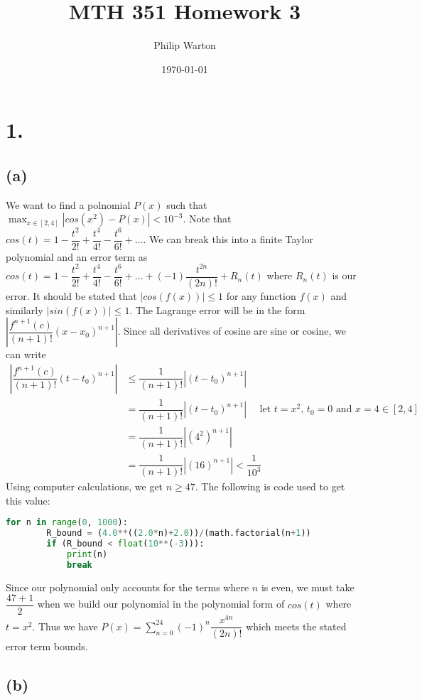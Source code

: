 \documentclass{article}
\begin{document}
\title{MTH 351 Homework 3}
\author{Philip Warton}
\date{\today}
\maketitle

\section*{1.}
	\subsection*{(a)}
		We want to find a polnomial $P(x)$ such that $\max_{x \in [2,4]} |cos(x^2) - P(x)| < 10^{-3}$.
		Note that $cos(t) = 1 - \dfrac{t^2}{2!} + \dfrac{t^4}{4!} - \dfrac{t^6}{6!} + ...$.
		We can break this into a finite Taylor polynomial and an error term as
		$cos(t) = 1 - \dfrac{t^2}{2!} + \dfrac{t^4}{4!} - \dfrac{t^6}{6!} + ... + (-1)\dfrac{t^{2n}}{(2n)!} + R_n(t)$ where $R_n(t)$ is our error.
		It should be stated that $|cos(f(x))| \leqslant 1$ for any function $f(x)$ and similarly $|sin(f(x))| \leqslant 1$.
		The Lagrange error will be in the form $\left| \dfrac{f^{n+1}(c)}{(n+1)!}(x-x_0)^{n+1}\right|$.
		Since all derivatives of cosine are sine or cosine, we can write
		\begin{align*}
			\left| \dfrac{f^{n+1}(c)}{(n+1)!}(t-t_0)^{n+1}\right| & \leqslant \dfrac{1}{(n+1)!}\left|(t-t_0)^{n+1}\right| \\
			& = \dfrac{1}{(n+1)!}\left|(t-t_0)^{n+1}\right| \ \ \ \ \ \ \text{let $t = x^2$, $t_0 = 0$ and $x = 4 \in [2,4]$} \\
			& =  \dfrac{1}{(n+1)!}\left|(4^2)^{n+1}\right| \\
			& =  \dfrac{1}{(n+1)!}\left|(16)^{n+1}\right| < \dfrac{1}{10^3}
		\end{align*}
		Using computer calculations, we get $n \geqslant 47$.
		The following is code used to get this value:
		\begin{lstlisting}[language=Python]
	for n in range(0, 1000):
  		R_bound = (4.0**((2.0*n)+2.0))/(math.factorial(n+1))
		if (R_bound < float(10**(-3))):
			print(n)
			break
		\end{lstlisting}
		Since our polynomial only accounts for the terms where $n$ is even, we must take $\dfrac{47+1}{2}$ when we build our polynomial in the polynomial form of $cos(t)$ where $t = x^2$.
		Thus we have $ P(x) = {\sum}_{n=0}^{24}(-1)^n\dfrac{x^{4n}}{(2n)!}$ which meets the stated error term bounds.
	\subsection*{(b)}
\end{document}
